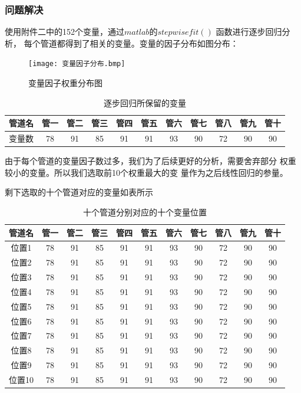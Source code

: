         \subsubsection{问题解决}
            使用附件二中的152个变量，通过$matlab$的$stepwisefit()$
            函数进行逐步回归分析，
            每个管道都得到了相关的变量。变量的因子分布如图分布：
            \begin{figure}[H]
                \texttt{[image: 变量因子分布.bmp]}
                \caption{变量因子权重分布图}
            \end{figure}
            \begin{table}[H]
                \centering
                \begin{tabular}{|c|c|c|c|c|c|c|c|c|c|c|}
                    \hline
                    管道名&管一&管二&管三&管四&管五&管六&管七&管八&管九&管十\\
                    \hline
                    变量数&78&91&85&91&91&93&90&72&90&90\\
                    \hline
                \end{tabular}
                \caption{逐步回归所保留的变量}
            \end{table}
            由于每个管道的变量因子数过多，我们为了后续更好的分析，需要舍弃部分
            权重较小的变量。所以我们选取前10个权重最大的变
            量作为之后线性回归的参量。\par
            剩下选取的十个管道对应的变量如表所示
            \begin{table}[H]
                \centering
                \begin{tabular}{|c|c|c|c|c|c|c|c|c|c|c|}
                    \hline
                    管道名&管一&管二&管三&管四&管五&管六&管七&管八&管九&管十\\
                    \hline
                    位置1&78&91&85&91&91&93&90&72&90&90\\
                    \hline
                    位置2&78&91&85&91&91&93&90&72&90&90\\
                    \hline
                    位置3&78&91&85&91&91&93&90&72&90&90\\
                    \hline
                    位置4&78&91&85&91&91&93&90&72&90&90\\
                    \hline
                    位置5&78&91&85&91&91&93&90&72&90&90\\
                    \hline
                    位置6&78&91&85&91&91&93&90&72&90&90\\
                    \hline
                    位置7&78&91&85&91&91&93&90&72&90&90\\
                    \hline
                    位置8&78&91&85&91&91&93&90&72&90&90\\
                    \hline
                    位置9&78&91&85&91&91&93&90&72&90&90\\
                    \hline
                    位置10&78&91&85&91&91&93&90&72&90&90\\
                    \hline
                \end{tabular}
                \caption{十个管道分别对应的十个变量位置}
            \end{table}
